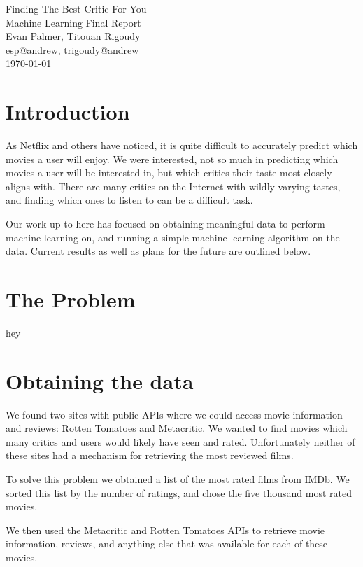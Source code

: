 \documentclass[12pt]{article}
\makeatletter
\newcommand{\myname}{Evan Palmer, Titouan Rigoudy}
\newcommand{\myandrew}{esp@andrew, trigoudy@andrew}
\newcommand{\thedate}{\today}
\makeatother
\begin{document}
	\medskip    
	\thispagestyle{plain}
	\begin{center}                 
	{\LARGE Finding The Best Critic For You} \\
	\medskip
	Machine Learning Final Report \\
	\smallskip
	\myname \\
	\myandrew \\
	\thedate \\
	\end{center}
	\vspace{0.5cm}

\section{Introduction}

As Netflix and others have noticed, it is quite difficult to accurately predict which movies a user will enjoy. We were interested, not so much in predicting which movies a user will be interested in, but which critics their taste most closely aligns with. There are many critics on the Internet with wildly varying tastes, and finding which ones to listen to can be a difficult task.

Our work up to here has focused on obtaining meaningful data to perform machine learning on, and running a simple machine learning algorithm on the data. Current results as well as plans for the future are outlined below.

\section{The Problem}

hey

\section{Obtaining the data}

	We found two sites with public APIs where we could access movie information and reviews: Rotten Tomatoes and Metacritic. We wanted to find movies which many critics and users would likely have seen and rated. Unfortunately neither of these sites had a mechanism for retrieving the most reviewed films. 

	To solve this problem we obtained a list of the most rated films from IMDb. We sorted this list by the number of ratings, and chose the five thousand most rated movies. 

	We then used the Metacritic and Rotten Tomatoes APIs to retrieve movie information, reviews, and anything else that was available for each of these movies.
\end{document}

